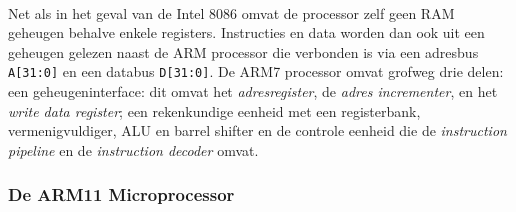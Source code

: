 \paragraph{}
Net als in het geval van de Intel 8086 omvat de processor zelf geen RAM geheugen behalve enkele registers. Instructies en data worden dan ook uit een geheugen gelezen naast de ARM processor die verbonden is via een adresbus \texttt{A[31:0]} en een databus \texttt{D[31:0]}. De ARM7 processor omvat grofweg drie delen: een geheugeninterface: dit omvat het \emph{adresregister}, de \emph{adres incrementer}, en het \emph{write data register}; een rekenkundige eenheid met een registerbank, vermenigvuldiger, ALU en barrel shifter en de controle eenheid die de \emph{instruction pipeline} en de \emph{instruction decoder} omvat.
\subsubsection{De ARM11 Microprocessor}
